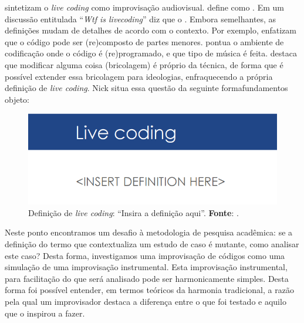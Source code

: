  sintetizam o \emph{live coding} como improvisação audiovisual.  define como . Em um discussão entitulada ``\emph{Wtf is livecoding}'' diz que o  . Embora semelhantes, as definições mudam de detalhes de acordo com o contexto. Por exemplo,  enfatizam que o código pode ser (re)composto de partes menores.  pontua o ambiente de codificação onde o código é (re)programado, e que tipo de música é feita.  destaca que modificar alguma coisa (bricolagem) é próprio da técnica, de forma que é possível extender essa bricolagem para ideologias, enfraquecendo a própria definição de \emph{live coding}. Nick  situa essa questão da seguinte formafundamentos objeto:

  \begin{figure}[h]
    \centering
    \includegraphics[scale=0.7]{imagens/live_coding_def.png}
    \caption{Definição de \emph{live coding}: ``Insira a definição aqui''. \textbf{Fonte}: .}
    \label{fig:live_coding_def}
  \end{figure}

Neste ponto encontramos um desafio à metodologia de pesquisa acadêmica: se a definição do termo que contextualiza um estudo de caso é mutante, como analisar este caso? Desta forma, investigamos uma improvisação de códigos como uma simulação de uma improvisação instrumental. Esta improvisação instrumental, para facilitação do que será analisado pode ser harmonicamente simples. Desta forma foi possível entender, em termos teóricos da harmonia tradicional, a razão pela qual um improvisador destaca a diferença entre o que foi testado e aquilo que o inspirou a fazer. 

